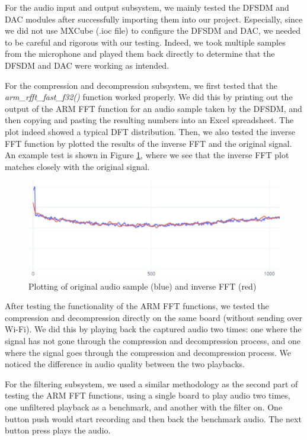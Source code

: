 \documentclass[journal]{IEEEtran}
\begin{document}
For the audio input and output subsystem, we mainly tested the DFSDM and DAC modules after successfully importing them into our project. Especially, since we did not use MXCube (.ioc file) to configure the DFSDM and DAC, we needed to be careful and rigorous with our testing. Indeed, we took multiple samples from the microphone and played them back directly to determine that the DFSDM and DAC were working as intended.
\vspace{10pt}

For the compression and decompression subsystem, we first tested that the \textit{arm\_rfft\_fast\_f32()} function worked properly. We did this by printing out the output of the ARM FFT function for an audio sample taken by the DFSDM, and then copying and pasting the resulting numbers into an Excel spreadsheet. The plot indeed showed a typical DFT distribution. Then, we also tested the inverse FFT function by plotted the results of the inverse FFT and the original signal. An example test is shown in Figure \ref{fig:IFFT_test}, where we see that the inverse FFT plot matches closely with the original signal.
\begin{figure}[H]
    \centering
    \includegraphics[width=0.8\linewidth]{bibtex//Images/inverse fft.png}
    \caption{Plotting of original audio sample (blue) and inverse FFT (red)}
    \label{fig:IFFT_test}
\end{figure}

After testing the functionality of the ARM FFT functions, we tested the compression and decompression directly on the same board (without sending over Wi-Fi). We did this by playing back the captured audio two times: one where the signal has not gone through the compression and decompression process, and one where the signal goes through the compression and decompression process. We noticed the difference in audio quality between the two playbacks. 
\vspace{10pt}

For the filtering subsystem, we used a similar methodology as the second part of testing the ARM FFT functions, using a single board to play audio two times, one unfiltered playback as a benchmark, and another with the filter on. One button push would start recording and then back the benchmark audio. The next button press plays the audio.
\end{document}
